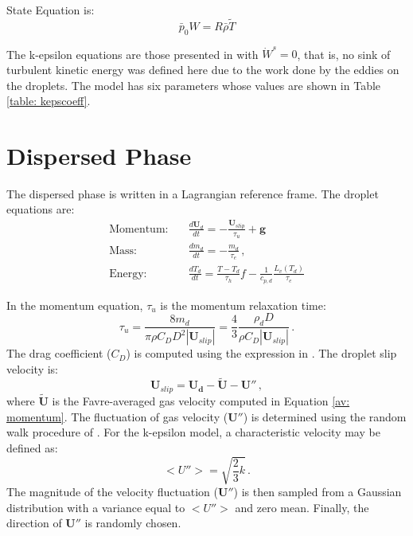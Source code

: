 \documentclass[preprint,12pt,review]{elsarticle}
\newcommand{\bv}[1]{\mathbf{#1}}
\begin{document}
State Equation is:
\begin{equation}
  \bar{p}_0 W = R \bar{\rho} \tilde{T} 
\end{equation}

The k-epsilon equations are those presented in \citet{nordin} with $\dot{W}^{s}= 0$, that is, no sink of turbulent kinetic energy was defined here due to the work done by the eddies on the droplets. The model has six parameters whose values are shown in Table \ref{table: kepscoeff}.

\section{Dispersed Phase}\label{dispersed_phase}

The dispersed phase is written in a Lagrangian reference frame. The droplet equations are:
\begin{align}\label{eq: drop_dudt}
\text{Momentum:}&\quad \frac{d\bv{U}_d}{dt} = -\frac{ \bv{U}_{slip}}{\tau_{u}} + \bv{g}  \\
\label{eq: dropmass}
\text{Mass:}&\quad \frac{dm_d}{dt}=-\frac{m_d}{\tau_e} \, , \\
\text{Energy:}&\quad \frac{dT_d}{dt}= \frac{T-T_d}{\tau_h} f - \frac{1}{c_{p,d}} \frac{L_v\left( T_d\right) }{\tau_e}
\end{align}

In the momentum equation, $\tau_u$ is the momentum relaxation time:
\begin{equation}
 \tau_u = \frac{8 m_d}{\pi \rho C_D D^2 | \bv{U}_{slip}|}=\frac{4}{3}
\frac{\rho_d D}{\rho C_D | \bv{U}_{slip}|} \, .
\end{equation}
The drag coefficient ($C_D$) is computed using the expression in \citet{nordin}.
The droplet slip velocity is:
\begin{equation}\label{eq: Urel}
 \bv{U}_{slip} = \bv{U_d} - \tilde{\bv{U}}-\bv{U}'' \, ,
\end{equation}
where $\tilde{\bv{U}}$ is the Favre-averaged gas velocity computed in Equation \eqref{av: momentum}. The fluctuation of gas velocity ($\bv{U}''$) is determined using the random walk procedure of \citet{rourke}. For the k-epsilon model, a characteristic velocity may be defined as:
\begin{equation}
 <U''>= \sqrt{\frac{2}{3} k} \, .
\end{equation}
The magnitude of the velocity fluctuation ($\bv{U}''$) is then sampled from a Gaussian distribution with a variance equal to $<U''>$ and zero mean. Finally, the direction of $\bv{U}''$  is randomly chosen.
\end{document}
